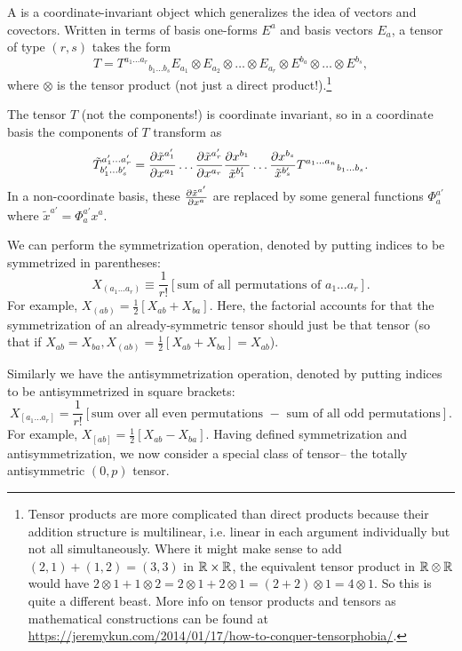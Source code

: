 \begin{defn}
A  is a coordinate-invariant object which generalizes the idea of vectors and covectors. Written in terms of basis one-forms $E^a$ and basis vectors $E_a$, a tensor of type $(r,s)$ takes the form
$$T={T^{a_1\ldots a_r}}_{b_1\ldots b_s} E_{a_1}\otimes E_{a_2}\otimes\ldots \otimes E_{a_r} \otimes E^{b_a}\otimes \ldots \otimes E^{b_s},$$
where $\otimes$ is the tensor product (not just a direct product!).\footnote{Tensor products are more complicated than direct products because their addition structure is multilinear, i.e. linear in each argument individually but not all simultaneously. Where it might make sense to add $(2,1)+(1,2)=(3,3)$ in $\mathbb{R}\times \mathbb{R}$, the equivalent tensor product in $\mathbb{R} \otimes \mathbb{R}$ would have $2 \otimes 1 + 1\otimes 2 = 2\otimes 1 + 2 \otimes 1= (2+2)\otimes 1 = 4 \otimes 1$. So this is quite a different beast. More info on tensor products and tensors as mathematical constructions can be found at \url{https://jeremykun.com/2014/01/17/how-to-conquer-tensorphobia/}.}
\end{defn}

The tensor $T$ (not the components!) is coordinate invariant, so in a coordinate basis the components of $T$ transform as
$${{\tilde T}^{a_1'\ldots a_r'}}_{b_1'\ldots b_s'}=\frac{\partial \tilde x^{a_1'}}{\partial x^{a_1}} \ldots \frac{\partial \tilde x^{a_r'}}{\partial x^{a_r}} \frac{\partial x^{b_1}}{\tilde x^{b_1'}} \ldots \frac{\partial x^{b_s}}{\tilde x^{b_s'}} {T^{a_1\ldots a_n}}_{b_1\ldots b_s}.$$
In a non-coordinate basis, these $\frac{\partial \tilde x^{a'}}{\partial x^a}$ are replaced by some general functions $\Phi ^{a'}_a$ where $\tilde x^{a'}=\Phi^{a'}_a x^a$.

We can perform the symmetrization operation, denoted by putting indices to be symmetrized in parentheses:
$$X_{(a_1 \ldots a_r)}\equiv \frac{1}{r!}\left[\text{sum of all permutations of }a_1\ldots a_r\right].$$
For example, $X_{(ab)}=\frac{1}{2}\left[X_{ab}+X_{ba}\right]$. Here, the factorial accounts for that the symmetrization of an already-symmetric tensor should just be that tensor (so that if $X_{ab}=X_{ba},X_{(ab)}=\frac{1}{2}[X_{ab}+X_{ba}]=X_{ab}$). 

Similarly we have the antisymmetrization operation, denoted by putting indices to be antisymmetrized in square brackets:
$$X_{[a_1\ldots a_r]}=\frac{1}{r!}\left[\text{sum over all even permutations } - \text { sum of all odd permutations}\right].$$
For example, $X_{[ab]}=\frac{1}{2}[X_{ab}-X_{ba}].$ Having defined symmetrization and antisymmetrization, we now consider a special class of tensor-- the totally antisymmetric $(0,p)$ tensor.

